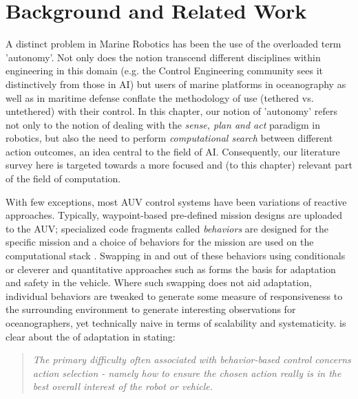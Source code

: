 \section{Background and Related Work}
\label{sec:related}


A distinct problem in Marine Robotics has been the use of the
overloaded term 'autonomy'. Not only does the notion transcend
different disciplines within engineering in this domain (e.g. the
Control Engineering community sees it distinctively from those in AI)
but users of marine platforms in oceanography as well as in maritime
defense conflate the methodology of use (tethered vs. untethered) with
their control. In this chapter, our notion of 'autonomy' refers not
only to the notion of dealing with the \emph{sense, plan and act}
paradigm in robotics, but also the need to perform \emph{computational
  search} between different action outcomes, an idea central to the
field of AI. Consequently, our literature survey here is targeted
towards a more focused and (to this chapter) relevant part of the
field of computation.

With few exceptions, most AUV control systems have been variations of
reactive approaches.  Typically, waypoint-based pre-defined mission
designs are uploaded to the AUV; specialized code fragments called
\emph{behaviors} are designed for the specific mission and a choice of
behaviors for the mission are used on the computational stack
\cite{bellingham94}. Swapping in and out of these behaviors using
conditionals or cleverer and quantitative approaches such as
\cite{Benjamin:2004} forms the basis for adaptation and safety in the
vehicle. Where such swapping does not aid adaptation, individual
behaviors are tweaked to generate some measure of responsiveness to
the surrounding environment \cite{yanwu08} to generate interesting
observations for oceanographers, yet technically naive in terms of
scalability and systematicity. \cite{Benjamin2006} is clear about the
 of adaptation in stating:

{\footnotesize
  \begin{quote}
\small \emph{The primary difficulty often associated with behavior-based control
concerns action selection - namely how to ensure the chosen action
really is in the best overall interest of the robot or vehicle.}
\end{quote}
} 

